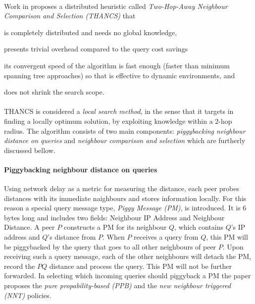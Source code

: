 \documentclass[a4paper,10pt]{article}
\begin{document}
\paragraph{}
Work in \cite{liu_thancs_2005, liu_thancs_2008} proposes a distributed heuristic called \emph{Two-Hop-Away Neighbour Comparison and Selection (THANCS)} that
\begin{inparaenum}
  \item is completely distributed and needs no global knowledge,
  \item presents trivial overhead compared to the query cost savings
  \item its convergent speed of the algorithm is fast enough (faster than minimum spanning tree approaches) so that is effective to dynamic environments, and
  \item does not shrink the search scope.
\end{inparaenum}

\paragraph{}
THANCS is considered a \emph{local search method}, in the sense that it targets in finding a locally optimum solution, by exploiting knowledge within a 2-hop radius. The algorithm consists of two main components: \emph{piggybacking neighbour distance on queries} and \emph{neighbour comparison and selection} which are furtherly discussed bellow.

\paragraph{Piggybacking neighbour distance on queries}
Using network delay as a metric for measuring the distance, each peer probes distances with its immediate naighbours and stores information locally. For this reason a special query message type, \emph{Piggy Message (PM)}, is introduced. It is 6 bytes long and includes two fields: Neighbour IP Address and Neighbour Distance. A peer $P$ constructs a PM for its neighbour $Q$, which contains $Q$'s IP address and $Q$'s distance from $P$. When $P$ receives a query from $Q$, this PM will be piggybacked by the query that goes to all other neighbours of peer $P$. Upon receiving such a query message, each of the other neighbours will detach the PM, record the $PQ$ distance and process the query. This PM will not be further forwarded. In selecting which incoming queries  should piggyback a PM the paper proposes the \emph{pure propability-based (PPB)} and the \emph{new neighbour triggered (NNT)} policies.
\end{document}
